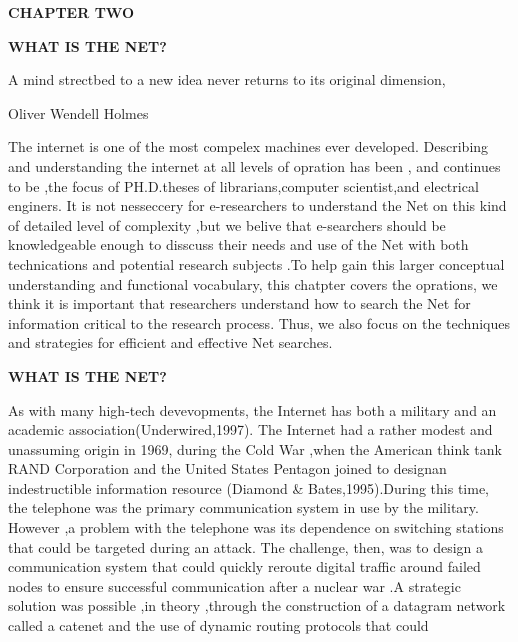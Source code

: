 \documentclass{book}
\begin{document}
\noindent \begin{flushright}
\textbf{CHAPTER TWO}

\noindent \textbf{                                                                                                                                                     }

\noindent \textbf{WHAT IS THE NET?}

\noindent \textbf{}

\noindent A mind strectbed to a new idea never returns to its original dimension,

\noindent Oliver Wendell Holmes

\noindent 

\noindent 
\end{flushright}

\noindent \begin{flushleft}
The internet is one of the most compelex machines ever developed. Describing and understanding the internet at all levels of opration has been , and continues to be ,the focus of PH.D.theses of librarians,computer scientist,and electrical enginers. It is not nesseccery for e-researchers to understand the Net on this kind of detailed level of complexity ,but we belive that e-searchers should be knowledgeable enough to disscuss their needs and use of the Net with both technications and potential research subjects .To help gain this larger conceptual understanding and functional vocabulary, this chatpter covers the oprations, we think it is important that researchers understand how to search the Net for information critical to the research process. Thus, we also focus on the techniques and strategies for efficient and effective Net searches.
\end{flushleft}

\noindent \begin{flushright}

\end{flushright}

\noindent \begin{flushleft}
\textbf{WHAT IS THE NET?}

\noindent \textbf{}

\noindent As with many high-tech devevopments, the Internet has both a military and an academic association(Underwired,1997). The Internet had a rather modest and unassuming origin in 1969, during the Cold War ,when the American think tank RAND Corporation and the United States Pentagon joined to designan indestructible information resource (Diamond \& Bates,1995).During this time, the telephone was the primary communication system in use by the military. However ,a problem with the telephone was its dependence on switching stations that could be targeted during an attack. The challenge, then, was to design a communication system that could quickly reroute digital traffic around failed nodes to ensure successful communication after a nuclear war .A strategic solution was possible ,in theory ,through the construction of a datagram network called a catenet and the use of dynamic routing protocols that could

\noindent 
\end{flushleft}
\end{document}
